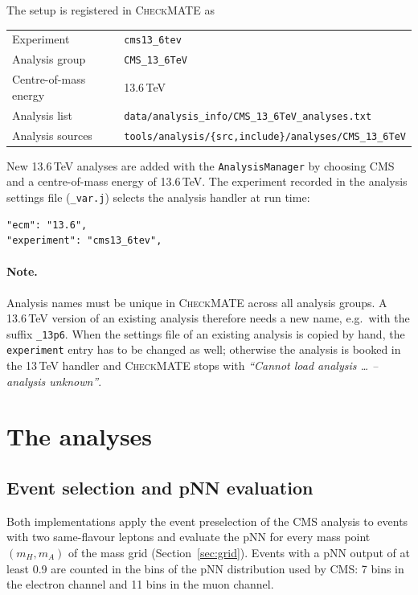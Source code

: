 \documentclass[11pt,a4paper]{article}
\newcommand{\cm}{\textsc{CheckMATE}}
\newcommand{\file}[1]{\texttt{#1}}
\begin{document}
The setup is registered in \cm{} as
\begin{center}
\begin{tabular}{ll}
\toprule
Experiment                 & \file{cms13\_6tev} \\
Analysis group             & \file{CMS\_13\_6TeV} \\
Centre-of-mass energy      & 13.6\,TeV \\
Analysis list              & \file{data/analysis\_info/CMS\_13\_6TeV\_analyses.txt} \\
Analysis sources           & \file{tools/analysis/\{src,include\}/analyses/CMS\_13\_6TeV} \\
\bottomrule
\end{tabular}
\end{center}

New 13.6\,TeV analyses are added with the \file{AnalysisManager} by
choosing CMS and a centre-of-mass energy of 13.6\,TeV. The experiment
recorded in the analysis settings file (\file{\_var.j}) selects the
analysis handler at run time:
\begin{lstlisting}
"ecm": "13.6",
"experiment": "cms13_6tev",
\end{lstlisting}

\paragraph{Note.} Analysis names must be unique in \cm{} across all
analysis groups. A 13.6\,TeV version of an existing analysis therefore needs
a new name, e.g.\ with the suffix \file{\_13p6}. When the settings file of
an existing analysis is copied by hand, the \texttt{experiment} entry has to
be changed as well; otherwise the analysis is booked in the 13\,TeV handler
and \cm{} stops with \emph{``Cannot load analysis \ldots{} -- analysis
unknown''}.

\section{The analyses}

\subsection{Event selection and pNN evaluation}

Both implementations apply the event preselection of the CMS analysis to
events with two same-flavour leptons and evaluate the pNN for every mass
point $(m_H, m_A)$ of the mass grid (Section~\ref{sec:grid}). Events with a
pNN output of at least 0.9 are counted in the bins of the pNN distribution
used by CMS: 7 bins in the electron channel and 11 bins in the muon channel.
\end{document}
